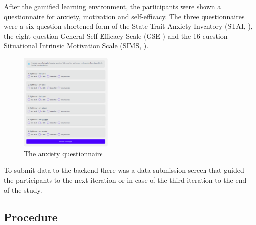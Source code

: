 After the gamified learning environment, the participants were shown a questionnaire for anxiety, motivation and self-efficacy.
The three questionnaires were a six-question shortened form of the State-Trait Anxiety Inventory (STAI, \textcite{marteauDevelopmentSixitemShortform1992}), the eight-question General Self-Efficacy Scale (GSE \textcite{guayAssessmentSituationalIntrinsic2000}) and the 16-question Situational Intrinsic Motivation Scale (SIMS, \textcite{chenValidationNewGeneral2001}).
\begin{figure}[H]
  \centering
  \includegraphics[width=0.4\textwidth]{img/Stai.png}
  \caption{The anxiety questionnaire}
  \label{fig:figureAnxiety}
\end{figure}
To submit data to the backend there was a data submission screen that guided the participants to the next iteration or in case of the third iteration to the end of the study.

\subsection{Procedure}

